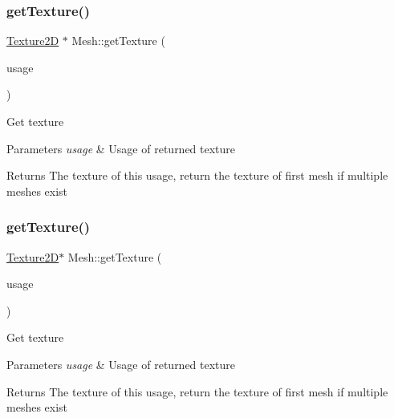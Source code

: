 \subsubsection{\texorpdfstring{get\+Texture()}{getTexture()}\hspace{0.1cm}{\footnotesize\ttfamily [3/4]}}
{\footnotesize\ttfamily \hyperlink{classTexture2D}{Texture2D} $\ast$ Mesh\+::get\+Texture (\begin{DoxyParamCaption}\item[{N\+Texture\+Data\+::\+Usage}]{usage }\end{DoxyParamCaption})}

Get texture 
\begin{DoxyParams}{Parameters}
{\em usage} & Usage of returned texture \\
\hline
\end{DoxyParams}
\begin{DoxyReturn}{Returns}
The texture of this usage, return the texture of first mesh if multiple meshes exist 
\end{DoxyReturn}
\mbox{\label{classMesh_a541ccc1451f8c8c6554f5e7f824714ef}} 
\subsubsection{\texorpdfstring{get\+Texture()}{getTexture()}\hspace{0.1cm}{\footnotesize\ttfamily [4/4]}}
{\footnotesize\ttfamily \hyperlink{classTexture2D}{Texture2D}$\ast$ Mesh\+::get\+Texture (\begin{DoxyParamCaption}\item[{N\+Texture\+Data\+::\+Usage}]{usage }\end{DoxyParamCaption})}

Get texture 
\begin{DoxyParams}{Parameters}
{\em usage} & Usage of returned texture \\
\hline
\end{DoxyParams}
\begin{DoxyReturn}{Returns}
The texture of this usage, return the texture of first mesh if multiple meshes exist 
\end{DoxyReturn}
\mbox{\label{classMesh_a6424c1f70f73adcc51b23cee023b00c4}} 
